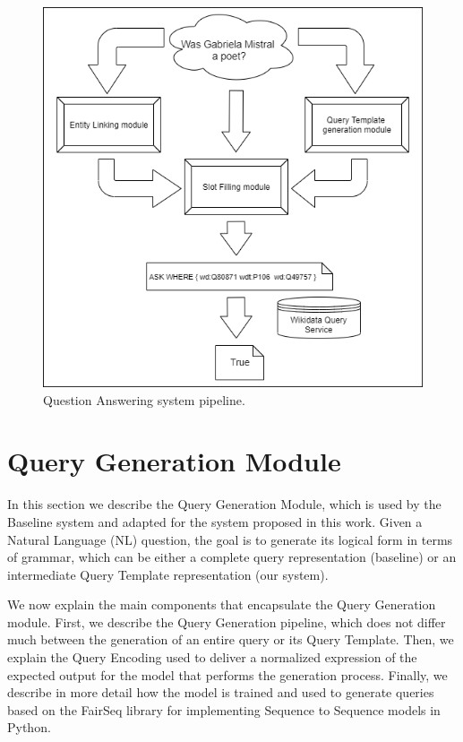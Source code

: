 \begin{figure}[!h]
    \centering
    \includegraphics[scale=.5]{imagenes/3_system_overview/QuestionAnsweringPipeline.png}
    \caption{Question Answering system pipeline.}
    \label{fig:questionAnsweringOverview}
\end{figure}

\section{Query Generation Module}
\label{cap3:system/queryGenModule}
In this section we describe the Query Generation Module, which is used by the Baseline system 
and adapted for the system proposed in this work. Given a Natural Language (NL) question, the 
goal is to generate its logical form in terms of \SPARQL{} grammar, which can be either a 
complete \SPARQL{} query representation (baseline) or an intermediate Query Template 
representation (our system). 

We now explain the main components that encapsulate the Query Generation module. First, we 
describe the Query Generation pipeline, which does not differ much between the generation of 
an entire \SPARQL{} query or its Query Template. Then, we explain the Query Encoding used to 
deliver a normalized expression of the expected output for the model that performs the 
generation process. Finally, we describe in more detail how the model is trained and used to 
generate queries based on the FairSeq library for implementing Sequence to Sequence models in 
Python.

